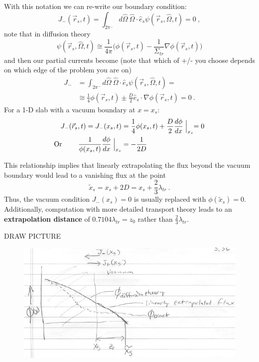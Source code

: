 \documentclass[12pt]{article}
\newcommand{\vOmega}{\ensuremath{\hat{\Omega}}}
\begin{document}
With this notation we can re-write our boundary condition:
\[J_{-}(\vec{r}_s,t) = \int_{2\pi^{-}} d\vOmega \: \vOmega \cdot \hat{e}_s \psi(\vec{r}_s, \vOmega, t) = 0 \:,\]
note that in diffusion theory
\[\psi(\vec{r}_s, \vOmega, t) \cong \frac{1}{4\pi}\bigl(\phi(\vec{r}_s, t)  -\frac{1}{\Sigma_{tr}} \nabla \phi(\vec{r}_s, t)\bigr)\]
%
and then our partial currents become (note that which of +/- you choose depends on which edge of the problem you are on)
%
\begin{align*}
J_{-} &= \int_{2\pi^{-}} d\vOmega \: \vOmega \cdot \hat{e}_s \psi(\vec{r}_s, \vOmega, t) =\\
&\cong \frac{1}{4} \phi(\vec{r}_s, t) \pm \frac{D}{2} \hat{e}_s \cdot \nabla \phi(\vec{r}_s, t) = 0\:.
\end{align*} 
%
For a 1-D slab with a vacuum boundary at $x=x_s$:
%
\begin{align*}
J_{-}(\vec{r}_s, t) = J_{-}(x_s, t) &= \frac{1}{4} \phi(x_s, t) + \frac{D}{2}\frac{d \phi}{dx}\Bigm\lvert_{x_s} = 0 \\
\text{Or } \qquad \frac{1}{\phi(x_s, t)}\frac{d \phi}{dx}\Bigm\lvert_{x_s} &= -\frac{1}{2D}
\end{align*}

This relationship implies that linearly extrapolating the flux beyond the vacuum boundary would lead to a vanishing flux at the point
\[\tilde{x}_s = x_s + 2D = x_s + \frac{2}{3}\lambda_{tr}\:.\]
%
Thus, the vacuum condition $J_{-}(x_s) = 0$ is usually replaced with $\phi(\tilde{x}_s)= 0$. Additionally, computation with more detailed transport theory leads to an \textbf{extrapolation distance} of $0.7104\lambda_{tr} = z_0$ rather than $\frac{2}{3}\lambda_{tr}$. 

DRAW PICTURE
%
\begin{figure}[h!]
\begin{center}
\includegraphics[height=3 in]{../figs/DiffusionBC}
\end{center}
\end{figure}
\end{document}
